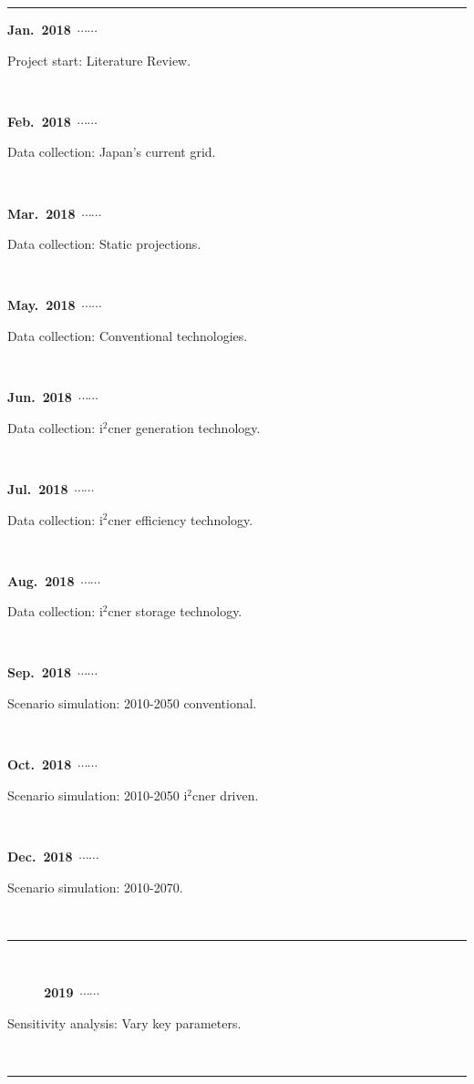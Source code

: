 \newcommand\ytl[2]{\parbox[b]{0.3\textwidth}{\hfill{\color{orange!90}\bfseries\sffamily #1}~$\cdots\cdots$~}\makebox[0pt][c]{$\bullet$}\vrule\quad 
\parbox[c]{0.7\textwidth}{\vspace{7pt}\color{dblue!80}\raggedright\sffamily #2\\[7pt]}\\[-3pt]}
\begin{table}
\centering
\begin{minipage}[t]{\linewidth}
\color{gray}
\rule{\linewidth}{1pt}
\ytl{Jan.~2018}{Project start: \hfill Literature Review.}
\ytl{Feb.~2018}{Data collection: \hfill Japan's current grid.}
\ytl{Mar.~2018}{Data collection: \hfill Static projections.}
\ytl{May.~2018}{Data collection: \hfill Conventional technologies.}
\ytl{Jun.~2018}{Data collection: \hfill i$^2$cner generation technology.}
\ytl{Jul.~2018}{Data collection: \hfill i$^2$cner efficiency technology.}
\ytl{Aug.~2018}{Data collection: \hfill i$^2$cner storage technology.}
\ytl{Sep.~2018}{Scenario simulation: \hfill 2010-2050 conventional.}
\ytl{Oct.~2018}{Scenario simulation: \hfill 2010-2050 i$^2$cner driven.}
\ytl{Dec.~2018}{Scenario simulation: \hfill 2010-2070.}
\rule{\linewidth}{1pt}%
\\%
\bigskip
\ytl{~~~~~2019}{Sensitivity analysis: \hfill Vary key parameters.}
\bigskip
\rule{\linewidth}{1pt}%
\end{minipage}%
\end{table}
